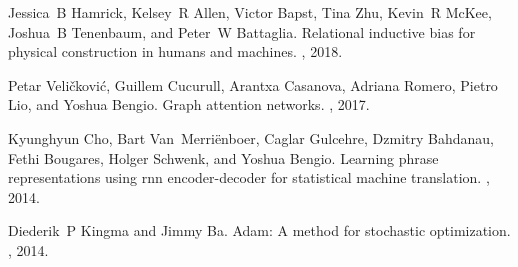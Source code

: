 \documentclass{article}
\begin{document}
\begin{thebibliography}{10}
Jessica~B Hamrick, Kelsey~R Allen, Victor Bapst, Tina Zhu, Kevin~R McKee,
  Joshua~B Tenenbaum, and Peter~W Battaglia.
\newblock Relational inductive bias for physical construction in humans and
  machines.
, 2018.

Petar Veli{\v{c}}kovi{\'c}, Guillem Cucurull, Arantxa Casanova, Adriana Romero,
  Pietro Lio, and Yoshua Bengio.
\newblock Graph attention networks.
, 2017.

Kyunghyun Cho, Bart Van~Merri{\"e}nboer, Caglar Gulcehre, Dzmitry Bahdanau,
  Fethi Bougares, Holger Schwenk, and Yoshua Bengio.
\newblock Learning phrase representations using rnn encoder-decoder for
  statistical machine translation.
, 2014.

Diederik~P Kingma and Jimmy Ba.
\newblock Adam: A method for stochastic optimization.
, 2014.

\end{thebibliography}
\end{document}
